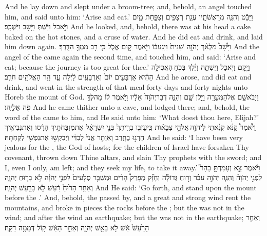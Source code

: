 {And he lay down and slept under a broom-tree; and, behold, an angel touched him, and said unto him: ‘Arise and eat.’}
{וַיַּבֵּ֕ט וְהִנֵּ֧ה מְרַאֲשֹׁתָ֛יו עֻגַ֥ת רְצָפִ֖ים וְצַפַּ֣חַת מָ֑יִם וַיֹּ֣אכַל וַיֵּ֔שְׁתְּ וַיָּ֖שׇׁב וַיִּשְׁכָּֽב׃}
{And he looked, and, behold, there was at his head a cake baked on the hot stones, and a cruse of water. And he did eat and drink, and laid him down again.}
{וַיָּ֩שׇׁב֩ מַלְאַ֨ךְ יְהֹוָ֤ה \pasek  שֵׁנִית֙ וַיִּגַּע\maqqaf בּ֔וֹ וַיֹּ֖אמֶר ק֣וּם אֱכֹ֑ל כִּ֛י רַ֥ב מִמְּךָ֖ הַדָּֽרֶךְ׃}
{And the angel of the \lord\space came again the second time, and touched him, and said: ‘Arise and eat; because the journey is too great for thee.’}
{וַיָּ֖קׇם וַיֹּ֣אכַל וַיִּשְׁתֶּ֑ה וַיֵּ֜לֶךְ בְּכֹ֣חַ \legarmeh  הָאֲכִילָ֣ה הַהִ֗יא אַרְבָּעִ֥ים יוֹם֙ וְאַרְבָּעִ֣ים לַ֔יְלָה עַ֛ד הַ֥ר הָאֱלֹהִ֖ים חֹרֵֽב׃}
{And he arose, and did eat and drink, and went in the strength of that meal forty days and forty nights unto Horeb the mount of God.}
{וַיָּבֹא\maqqaf שָׁ֥ם אֶל\maqqaf הַמְּעָרָ֖ה וַיָּ֣לֶן שָׁ֑ם וְהִנֵּ֤ה דְבַר\maqqaf יְהֹוָה֙ אֵלָ֔יו וַיֹּ֣אמֶר ל֔וֹ מַה\maqqaf לְּךָ֥ פֹ֖ה אֵלִיָּֽהוּ׃}
{And he came thither unto a cave, and lodged there; and, behold, the word of the \lord\space came to him, and He said unto him: ‘What doest thou here, Elijah?’}
{וַיֹּ֩אמֶר֩ קַנֹּ֨א קִנֵּ֜אתִי לַיהֹוָ֣ה \legarmeh  אֱלֹהֵ֣י צְבָא֗וֹת כִּֽי\maqqaf עָזְב֤וּ בְרִֽיתְךָ֙ בְּנֵ֣י יִשְׂרָאֵ֔ל אֶת\maqqaf מִזְבְּחֹתֶ֣יךָ הָרָ֔סוּ וְאֶת\maqqaf נְבִיאֶ֖יךָ הָרְג֣וּ בֶחָ֑רֶב וָאִוָּתֵ֤ר אֲנִי֙ לְבַדִּ֔י וַיְבַקְשׁ֥וּ אֶת\maqqaf נַפְשִׁ֖י לְקַחְתָּֽהּ׃}
{And he said: ‘I have been very jealous for the \lord, the God of hosts; for the children of Israel have forsaken Thy covenant, thrown down Thine altars, and slain Thy prophets with the sword; and I, even I only, am left; and they seek my life, to take it away.’}
{וַיֹּ֗אמֶר צֵ֣א וְעָמַדְתָּ֣ בָהָר֮ לִפְנֵ֣י יְהֹוָה֒ וְהִנֵּ֧ה יְהֹוָ֣ה עֹבֵ֗ר וְר֣וּחַ גְּדוֹלָ֡ה וְחָזָ֞ק מְפָרֵק֩ הָרִ֨ים וּמְשַׁבֵּ֤ר סְלָעִים֙ לִפְנֵ֣י יְהֹוָ֔ה לֹ֥א בָר֖וּחַ יְהֹוָ֑ה וְאַחַ֤ר הָר֙וּחַ֙ רַ֔עַשׁ לֹ֥א בָרַ֖עַשׁ יְהֹוָֽה׃}
{And He said: ‘Go forth, and stand upon the mount before the \lord.’ And, behold, the \lord\space passed by, and a great and strong wind rent the mountains, and broke in pieces the rocks before the \lord; but the \lord\space was not in the wind; and after the wind an earthquake; but the \lord\space was not in the earthquake;}
{וְאַחַ֤ר הָרַ֙עַשׁ֙ אֵ֔שׁ לֹ֥א בָאֵ֖שׁ יְהֹוָ֑ה וְאַחַ֣ר הָאֵ֔שׁ ק֖וֹל דְּמָמָ֥ה דַקָּֽה׃}

